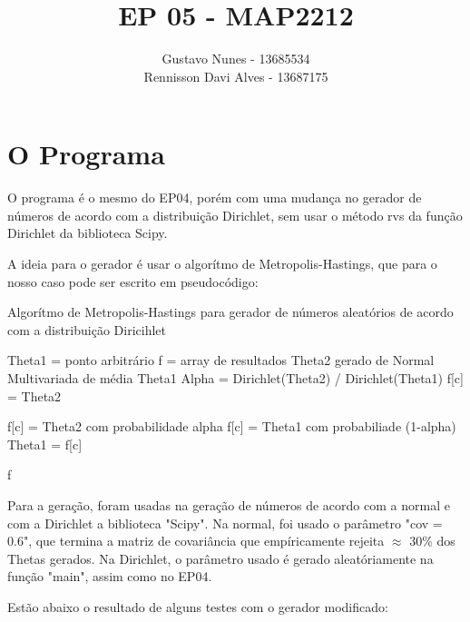 \documentclass{article}
\date{}
\title{\vspace{-3.0cm}EP 05 - MAP2212}
\author{Gustavo Nunes - 13685534 \\Rennisson Davi Alves - 13687175}
\begin{document}
    \maketitle
        \section{O Programa}
    O programa é o mesmo do EP04, porém com uma mudança no gerador de números de acordo com a distribuição Dirichlet, sem usar o método rvs da função Dirichlet da     biblioteca Scipy.

    A ideia para o gerador é usar o algorítmo de Metropolis-Hastings, que para o nosso caso pode ser escrito em pseudocódigo:


        \begin{algorithm}
            \caption{Algorítmo de Metropolis-Hastings para gerador de números aleatórios de acordo com a distribuição Diricihlet}\label{}
            \begin{algorithmic}
                \State Theta1 = ponto arbitrário
                \State f = array de resultados
                \State Theta2 gerado de Normal Multivariada de média Theta1
                \State Alpha = Dirichlet(Theta2) / Dirichlet(Theta1)
                    \State f[c] = Theta2 

                    \State f[c] = Theta2 com probabilidade alpha
                    \State f[c] = Theta1 com probabiliade (1-alpha)
                \EndIf
                \State Theta1 = f[c]

                \EndWhile
                \State
                \Return f
            \end{algorithmic}
        \end{algorithm}

        Para a geração, foram usadas na geração de números de acordo com a normal e com a Dirichlet a biblioteca "Scipy". Na normal, foi usado o parâmetro "cov = 0.6", que termina a matriz de covariância que empíricamente rejeita $\approx$ 30\% dos Thetas gerados. Na Dirichlet, o parâmetro usado é gerado aleatóriamente na função "main", assim como no EP04.

        Estão abaixo o resultado de alguns testes com o gerador modificado:
        \newpage
\end{document}
